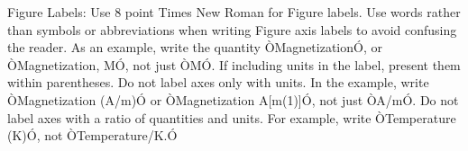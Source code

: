 \documentclass[letterpaper, 10 pt, conference]{ieeeconf}  %
\begin{document}
Figure Labels: Use 8 point Times New Roman for Figure labels. Use words rather than symbols or abbreviations when writing Figure axis labels to avoid confusing the reader. As an example, write the quantity ÒMagnetizationÓ, or ÒMagnetization, MÓ, not just ÒMÓ. If including units in the label, present them within parentheses. Do not label axes only with units. In the example, write ÒMagnetization (A/m)Ó or ÒMagnetization {A[m(1)]}Ó, not just ÒA/mÓ. Do not label axes with a ratio of quantities and units. For example, write ÒTemperature (K)Ó, not ÒTemperature/K.Ó
\end{document}
